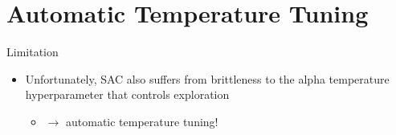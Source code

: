 \section{Automatic Temperature Tuning}
\begin{frame}{Limitation}
\begin{itemize}
    \item Unfortunately, SAC also suffers from brittleness to the alpha temperature hyperparameter that controls exploration
    \begin{itemize}
        \item $\to$ automatic temperature tuning!
    \end{itemize}
\end{itemize}
\end{frame}
